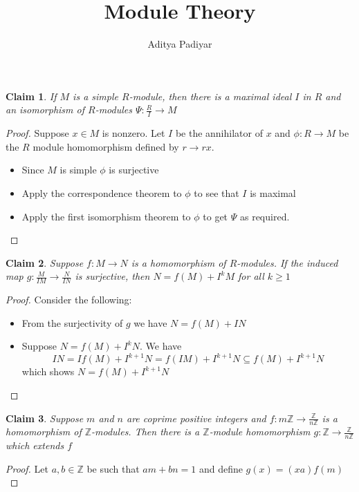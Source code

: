 \documentclass[a4paper,11pt]{article}
\title{Module Theory}
\author{Aditya Padiyar}
\newtheorem{claim}{Claim}
\begin{document}
\maketitle

\begin{claim}
  If $M$ is a simple $R$-module, then there is a maximal ideal $I$ in $R$ and an isomorphism of $R$-modules $\Psi:\frac{R}{I} \to M$
\end{claim}

\begin{proof}
  Suppose $x \in M$ is nonzero. 
  Let $I$ be the annihilator of $x$ and $\phi:R \to M$ be the $R$ module homomorphism defined by $r \to rx$.
  \begin{itemize}
    \item Since $M$ is simple $\phi$ is surjective
    \item Apply the correspondence theorem to $\phi$ to see that $I$ is maximal
    \item Apply the first isomorphism theorem to $\phi$ to get $\Psi$ as required.
  \end{itemize}
\end{proof}

\begin{claim}
  Suppose $f:M \to N$ is a homomorphism of $R$-modules.
  If the induced map $g:\frac{M}{IM} \to \frac{N}{IN}$ is surjective, then $N=f(M)+I^kM$ for all $k \geq 1$
\end{claim}

\begin{proof}
  Consider the following:
  \begin{itemize}
    \item From the surjectivity of $g$ we have $N=f(M) + IN$
    \item Suppose $N=f(M)+I^kN$. 
          We have \[IN = If(M) + I^{k+1}N = f(IM) + I^{k+1}N \subseteq f(M) + I^{k+1}N\] which shows $N=f(M)+I^{k+1}N$
  \end{itemize}
\end{proof}

\begin{claim}
  Suppose $m$ and $n$ are coprime positive integers and $f:m\mathbb{Z} \to \frac{\mathbb{Z}}{n\mathbb{Z}}$ is a homomorphism of $\mathbb{Z}$-modules. 
  Then there is a $\mathbb{Z}$-module homomorphism $g:\mathbb{Z} \to \frac{\mathbb{Z}}{n\mathbb{Z}}$ which extends $f$
\end{claim}

\begin{proof}
  Let $a,b \in \mathbb{Z}$ be such that $am+bn=1$ and define $g(x)=(xa)f(m)$
\end{proof}
\end{document}
